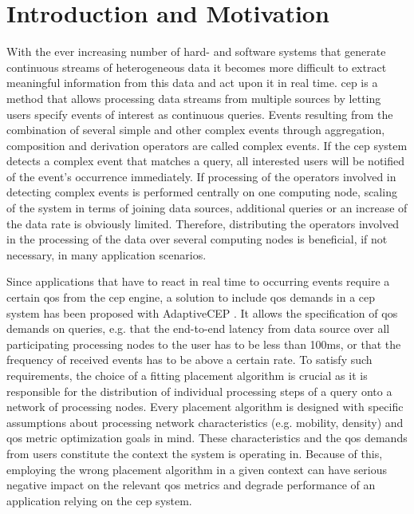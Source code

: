 
 

\chapter{Introduction and Motivation}

	

With the ever increasing number of hard- and software systems that generate continuous streams of heterogeneous data it becomes more difficult to extract meaningful information from this data and act upon it in real time. \gls{cep} is a method that allows processing data streams from multiple sources by letting users specify events of interest as continuous queries. Events resulting from the combination of several simple and other complex events through aggregation, composition and derivation operators are called complex events.
If the \gls{cep} system detects a complex event that matches a query, all interested users will be notified of the event's occurrence immediately. 
If processing of the operators involved in detecting complex events is performed centrally on one computing node, scaling of the system in terms of joining data sources, additional queries or an increase of the data rate is obviously limited. 
Therefore, distributing the operators involved in the processing of the data over several computing nodes is beneficial, if not necessary, in many application scenarios.

Since applications that have to react in real time to occurring events require a certain \gls{qos} from the \gls{cep} engine, a solution to include \gls{qos} demands in a \gls{cep} system has been proposed with AdaptiveCEP \cite{Weisenburger2017a}.
It allows the specification of \gls{qos} demands on queries, e.g. that the end-to-end latency from data source over all participating processing nodes to the user has to be less than 100ms, or that the frequency of received events has to be above a certain rate. To satisfy such requirements, the choice of a fitting placement algorithm is crucial as it is responsible for the distribution of individual processing steps of a query onto a network of processing nodes. Every placement algorithm is designed with specific  assumptions about processing network characteristics (e.g. mobility, density) and \gls{qos} metric optimization goals in mind. These characteristics and the \gls{qos} demands from users constitute the context the system is operating in. Because of this, employing the wrong placement algorithm in a given context can have serious negative impact on the relevant \gls{qos} metrics and degrade performance of an application relying on the \gls{cep} system. 

